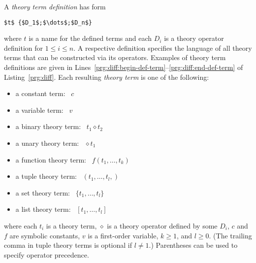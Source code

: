 A \emph{theory term definition} has form
\begin{lstlisting}[numbers=none,mathescape=t]
$t$ {$D_1$;$\dots$;$D_n$}
\end{lstlisting}
where $t$ is a name for the defined terms and each $D_i$ is a theory operator definition 
for $1\leq i\leq n$.
A respective definition specifies the language of all theory terms
that can be constructed via %
its operators. %
%
Examples of theory term definitions are given in Lines~\ref{prg:diff:begin-def-term}--\ref{prg:diff:end-def-term} of Listing~\ref{prg:diff}.
Each resulting \emph{theory term} is one of the following:
\par\medskip\noindent
\begin{minipage}{0.5\linewidth}
  \begin{itemize}
  \item a constant term: \ $c$
  \item a variable term: \ $v$
  \item a binary theory term: \  $t_1 \diamond t_2$
  \item a unary theory term: \  ${}\diamond t_1$
  \end{itemize}
\end{minipage}
\begin{minipage}{0.5\linewidth}
\begin{itemize}
  \item a function theory term: \  $f(t_1,\dots,t_k)$
  \item a tuple theory term: \  $(t_1,\dots,t_l,)$
  \item a set theory term: \  $\{t_1,\dots,t_l\}$
  \item a list theory term: \  $[t_1,\dots,t_l]$
\end{itemize}
\end{minipage}
\par\medskip\noindent
where each $t_i$ is a theory term,
$\diamond$ is a theory operator defined by some $D_i$,
$c$ and $f$ are symbolic constants,
$v$ is a first-order variable,
$k\geq 1$, and
$l\geq 0$.
(The trailing comma in tuple theory terms is optional if $l \neq 1$.)
Parentheses can be used to specify operator precedence.

